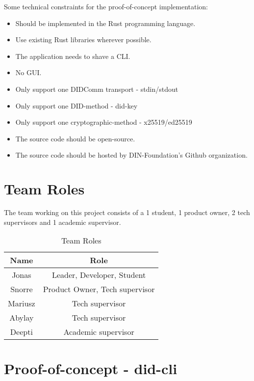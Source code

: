 Some technical constraints for the proof-of-concept implementation:

\begin{itemize}
    \item Should be implemented in the Rust programming language.
    \item Use existing Rust libraries wherever possible.
    \item The application needs to shave a CLI.
    \item No GUI.
    \item Only support one DIDComm transport - stdin/stdout
    \item Only support one DID-method - did-key
    \item Only support one cryptographic-method - x25519/ed25519
    \item The source code should be open-source.
    \item The source code should be hosted by \acrshort{DIN}-Foundation's Github organization.
\end{itemize}





\section{Team Roles}

The team working on this project consists of a 1 student, 1 product owner, 2 tech supervisors and 1 academic supervisor.

\begin{table}
  \centering
  \caption{Team Roles}
  \label{tab:example1}
  \begin{tabular}{cc}
    \hline
    Name  & Role \\
    \hline
    Jonas       & Leader, Developer, Student         \\
    Snorre      & Product Owner, Tech supervisor \\
    Mariusz     & Tech supervisor \\
    Abylay      & Tech supervisor \\
    Deepti      & Academic supervisor \\
    \hline
  \end{tabular}
\end{table}



\newpage

\section{Proof-of-concept - \acrshort{did-cli}}

